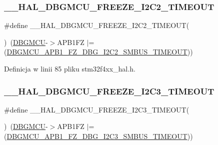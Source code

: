 \subsubsection{\texorpdfstring{\+\_\+\+\_\+\+H\+A\+L\+\_\+\+D\+B\+G\+M\+C\+U\+\_\+\+F\+R\+E\+E\+Z\+E\+\_\+\+I2\+C2\+\_\+\+T\+I\+M\+E\+O\+UT}{\_\_HAL\_DBGMCU\_FREEZE\_I2C2\_TIMEOUT}}
{\footnotesize\ttfamily \#define \+\_\+\+\_\+\+H\+A\+L\+\_\+\+D\+B\+G\+M\+C\+U\+\_\+\+F\+R\+E\+E\+Z\+E\+\_\+\+I2\+C2\+\_\+\+T\+I\+M\+E\+O\+UT(\begin{DoxyParamCaption}{ }\end{DoxyParamCaption})~(\hyperlink{group___peripheral__declaration_ga92ec6d9ec2251fda7d4ce09748cd74b4}{D\+B\+G\+M\+CU}-\/$>$A\+P\+B1\+FZ $\vert$= (\hyperlink{group___peripheral___registers___bits___definition_ga8f6320aba695f6c3f97608e478533e96}{D\+B\+G\+M\+C\+U\+\_\+\+A\+P\+B1\+\_\+\+F\+Z\+\_\+\+D\+B\+G\+\_\+\+I2\+C2\+\_\+\+S\+M\+B\+U\+S\+\_\+\+T\+I\+M\+E\+O\+UT}))}



Definicja w linii 85 pliku stm32f4xx\+\_\+hal.\+h.

\mbox{\label{group___h_a_l___exported___macros_gacd3fd0373b45de1b86be07bd4007c30e}} 
\subsubsection{\texorpdfstring{\+\_\+\+\_\+\+H\+A\+L\+\_\+\+D\+B\+G\+M\+C\+U\+\_\+\+F\+R\+E\+E\+Z\+E\+\_\+\+I2\+C3\+\_\+\+T\+I\+M\+E\+O\+UT}{\_\_HAL\_DBGMCU\_FREEZE\_I2C3\_TIMEOUT}}
{\footnotesize\ttfamily \#define \+\_\+\+\_\+\+H\+A\+L\+\_\+\+D\+B\+G\+M\+C\+U\+\_\+\+F\+R\+E\+E\+Z\+E\+\_\+\+I2\+C3\+\_\+\+T\+I\+M\+E\+O\+UT(\begin{DoxyParamCaption}{ }\end{DoxyParamCaption})~(\hyperlink{group___peripheral__declaration_ga92ec6d9ec2251fda7d4ce09748cd74b4}{D\+B\+G\+M\+CU}-\/$>$A\+P\+B1\+FZ $\vert$= (\hyperlink{group___peripheral___registers___bits___definition_ga7f7e5c708387aa1ddae35b892811b4e9}{D\+B\+G\+M\+C\+U\+\_\+\+A\+P\+B1\+\_\+\+F\+Z\+\_\+\+D\+B\+G\+\_\+\+I2\+C3\+\_\+\+S\+M\+B\+U\+S\+\_\+\+T\+I\+M\+E\+O\+UT}))}



